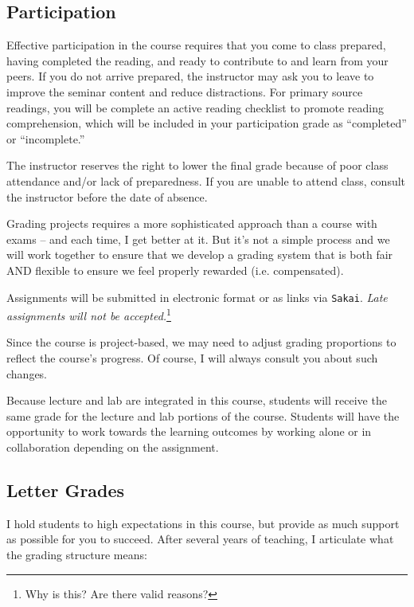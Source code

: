 \subsection{Participation}

Effective participation in the course requires that you come to class prepared, having completed the reading, and ready to contribute to and learn from your peers. If you do not arrive prepared, the instructor may ask you to leave to improve the seminar content and reduce distractions. For primary source readings, you will be complete an active reading checklist to promote reading comprehension, which will be included in your participation grade as ``completed'' or ``incomplete.''

The instructor reserves the right to lower the final grade because of poor class attendance and/or lack of preparedness. If you are unable to attend class, consult the instructor before the date of absence.


Grading projects requires a more sophisticated approach than a course with exams -- and each time, I get better at it. But it's not a simple process and we will work together to ensure that we develop a grading system that is both fair AND flexible to ensure we feel properly rewarded (i.e. compensated). 


Assignments will be submitted in electronic format or as links via \texttt{Sakai}. \emph{Late assignments will not be accepted.}\footnote{Why is this? Are there valid reasons?} 

Since the course is project-based, we may need to adjust grading proportions to reflect the course's progress. Of course, I will always consult you about such changes.

Because lecture and lab are integrated in this course, students will receive the same grade for the lecture and lab portions of the course. Students will have the opportunity to work towards the learning outcomes by working alone or in collaboration depending on the assignment. 

\subsection{Letter Grades}

I hold students to high expectations in this course, but provide as much support as possible for you to succeed. After several years of teaching, I articulate what the grading structure means:
  
